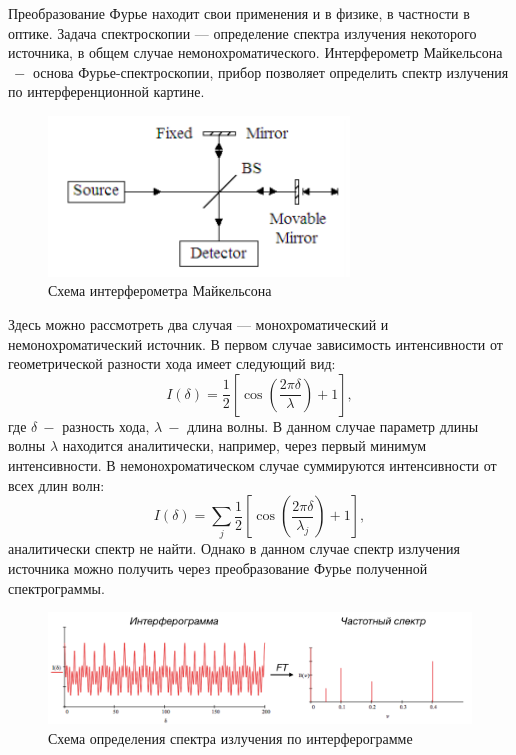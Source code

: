 Преобразование Фурье находит свои применения и в физике, в частности в оптике. Задача спектроскопии — определение спектра излучения некоторого источника, в общем случае немонохроматического.
Интерферометр Майкельсона $~-$ основа Фурье-спектроскопии, прибор позволяет определить спектр излучения по интерференционной картине.
\begin{figure}[!htb]
\centering
\includegraphics[width=8cm]{chapters/grigorev_s1/pictures/interferometer}%
\caption{Схема интерферометра Майкельсона}
\end{figure}
Здесь можно рассмотреть два случая — монохроматический и немонохроматический источник. В первом случае зависимость интенсивности от геометрической разности хода имеет следующий вид:
$$I(\delta) = \frac{1}{2} \left[ \cos\left( \frac{2 \pi \delta}{\lambda} \right) + 1 \right],$$ 
где $\delta ~-$ разность хода, $\lambda ~- $ длина волны. В данном случае параметр длины волны $\lambda$ находится аналитически, например, через первый минимум интенсивности.
В немонохроматическом случае суммируются интенсивности от всех длин волн:
$$I(\delta) = \sum \limits _j \frac{1}{2} \left[ \cos\left( \frac{2 \pi \delta}{\lambda_j} \right) + 1 \right],$$ 
аналитически спектр не найти. Однако в данном случае спектр излучения источника можно получить через преобразование Фурье полученной спектрограммы. 
\begin{figure}[!htb]
\centering
\includegraphics[width=14cm]{chapters/grigorev_s1/pictures/interferogram_spectrum}
\caption{Схема определения спектра излучения по интерферограмме}
\end{figure}

